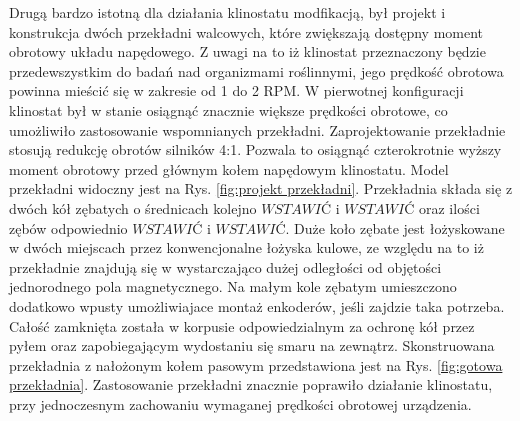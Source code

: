 Drugą bardzo istotną dla działania klinostatu modfikacją, był projekt i konstrukcja dwóch
 przekładni walcowych, które zwiększają dostępny moment obrotowy układu napędowego. Z uwagi na
  to iż klinostat przeznaczony będzie przedewszystkim do badań nad organizmami roślinnymi, jego
   prędkość obrotowa powinna mieścić się w zakresie od 1 do 2 RPM. W pierwotnej konfiguracji
    klinostat był w stanie osiągnąć znacznie większe prędkości obrotowe, co umożliwiło
     zastosowanie wspomnianych przekładni. Zaprojektowanie przekładnie stosują redukcję obrotów
      silników 4:1. Pozwala to osiągnąć czterokrotnie wyższy moment obrotowy przed głównym kołem
       napędowym klinostatu. Model przekładni widoczny jest na Rys. \ref{fig:projekt
       	 przekładni}. Przekładnia składa się z dwóch kół zębatych o średnicach kolejno $WSTAWIĆ$
         i $WSTAWIĆ$ oraz ilości zębów odpowiednio $WSTAWIĆ$ i $WSTAWIĆ$. Duże koło zębate jest
          łożyskowane w dwóch miejscach przez konwencjonalne łożyska kulowe, ze względu na to iż przekładnie znajdują się w wystarczająco dużej odległości od objętości jednorodnego
            pola magnetycznego. Na małym kole zębatym umieszczono dodatkowo wpusty umożliwiajace
             montaż enkoderów, jeśli zajdzie taka potrzeba. Całość zamknięta została w korpusie
              odpowiedzialnym za ochronę kół przez pyłem oraz zapobiegającym wydostaniu się
               smaru na zewnątrz. Skonstruowana przekładnia z nałożonym kołem pasowym
                przedstawiona jest na Rys. \ref{fig:gotowa przekładnia}. Zastosowanie przekładni
                 znacznie poprawiło działanie klinostatu, przy jednoczesnym zachowaniu wymaganej
                  prędkości obrotowej urządzenia.       



